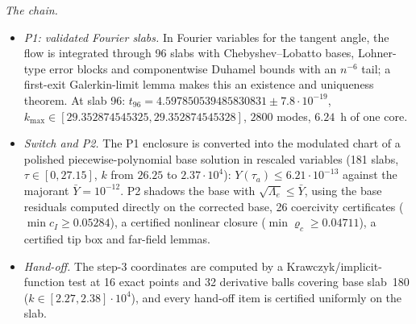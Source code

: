 \documentclass[11pt]{amsart}
\theoremstyle{definition}
\theoremstyle{remark}
\newcommand{\Lam}{\Lambda}
\begin{document}
\emph{The chain.}
\begin{itemize}[leftmargin=*,itemsep=1pt]
\item \emph{P1: validated Fourier slabs.} In Fourier variables for the tangent angle, the flow is integrated through 96 slabs with Chebyshev--Lobatto bases, Lohner-type error blocks and componentwise Duhamel bounds with an $n^{-6}$ tail; a first-exit Galerkin-limit lemma makes this an existence and uniqueness theorem. At slab 96: $t_{96}=4.597850539485830831\pm7.8\cdot10^{-19}$, $k_{\max}\in[29.352874545325,29.352874545328]$, $2800$ modes, $6.24$~h of one core.
\item \emph{Switch and P2.} The P1 enclosure is converted into the modulated chart of a polished piecewise-polynomial base solution in rescaled variables (181 slabs, $\tau\in[0,27.15]$, $k$ from $26.25$ to $2.37\cdot10^4$): $Y(\tau_a)\le6.21\cdot10^{-13}$ against the majorant $\bar Y=10^{-12}$. P2 shadows the base with $\sqrt{\Lam_e}\le\bar Y$, using the base residuals computed directly on the corrected base, 26 coercivity certificates ($\min c_I\ge0.05284$), a certified nonlinear closure ($\min\varrho_c\ge0.04711$), a certified tip box and far-field lemmas.
\item \emph{Hand-off.} The step-3 coordinates are computed by a Krawczyk/implicit-function test at 16 exact points and 32 derivative balls covering base slab~180 ($k\in[2.27,2.38]\cdot10^4$), and every hand-off item is certified uniformly on the slab.

\end{itemize}
\end{document}
